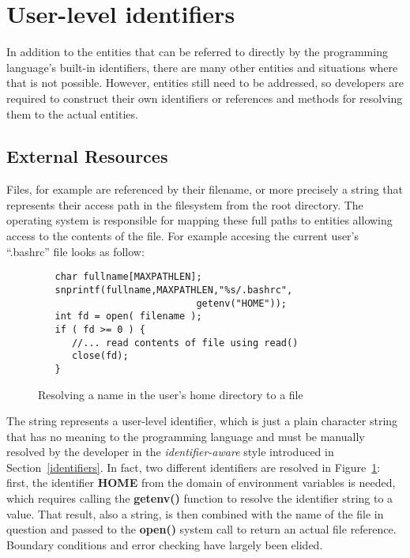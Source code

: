 \documentclass[preprint,authoryear]{acm_proc_article-sp}
\begin{document}
\section{User-level identifiers}


In addition to the entities that can be referred to directly by the programming language's 
built-in identifiers, there are many other entities and situations where that is not possible.
However, entities still need to be addressed, so developers are required
to construct their own identifiers or references and methods for resolving them to the actual
entities.

\subsection{External Resources}

Files, for example are referenced by their filename, or more precisely
a string that represents their access path in the filesystem from the root 
directory.   The operating system is responsible for mapping these full
paths to entities allowing access to the contents of the file.  For example accesing
the current user's ``.bashrc'' file looks as follow:

\begin{figure}[htbp]
\begin{center}
\begin{verbatim}
   char fullname[MAXPATHLEN];
   snprintf(fullname,MAXPATHLEN,"%s/.bashrc",
                            getenv("HOME"));
   int fd = open( filename );
   if ( fd >= 0 ) { 
      //... read contents of file using read()
      close(fd);
   }
\end{verbatim}
\caption{Resolving a name in the user's home directory to a file}
\label{posix-file-resolve}
\end{center}
\end{figure}

The string represents a user-level identifier, which is just a plain character
string that has no meaning to the programming language and must be 
manually resolved by the developer in the {\em identifier-aware} style 
introduced in Section~\ref{identifiers}.  In fact, two different identifiers
are resolved in Figure~\ref{posix-file-resolve}:  first, the identifier {\bf HOME}
from the domain of environment variables is needed, which requires calling
the {\bf getenv()} function to resolve the identifier string to a value.  That result,
also a string, is then combined with the name of the file in question and passed
to the {\bf open()} system call to return an actual file reference.  Boundary conditions
and error checking have largely been elided.
\end{document}
